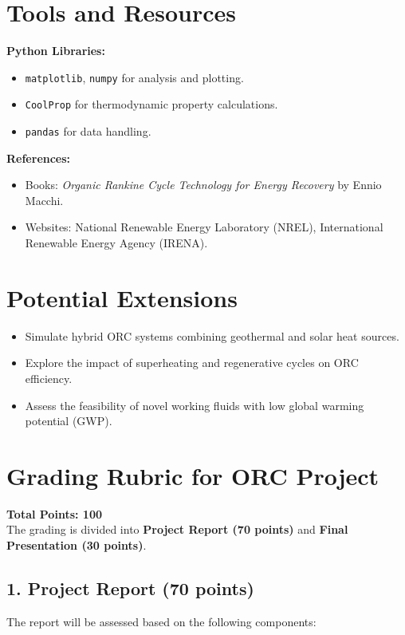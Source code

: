 \documentclass[11pt]{article}
\begin{document}
\section*{Tools and Resources}
\textbf{Python Libraries:}
\begin{itemize}
    \item \texttt{matplotlib}, \texttt{numpy} for analysis and plotting.
    \item \texttt{CoolProp} for thermodynamic property calculations.
    \item \texttt{pandas} for data handling.
\end{itemize}
\textbf{References:}
\begin{itemize}
    \item Books: \textit{Organic Rankine Cycle Technology for Energy Recovery} by Ennio Macchi.
    \item Websites: National Renewable Energy Laboratory (NREL), International Renewable Energy Agency (IRENA).
\end{itemize}

\section*{Potential Extensions}
\begin{itemize}
    \item Simulate hybrid ORC systems combining geothermal and solar heat sources.
    \item Explore the impact of superheating and regenerative cycles on ORC efficiency.
    \item Assess the feasibility of novel working fluids with low global warming potential (GWP).
\end{itemize}

\section*{Grading Rubric for ORC Project}

\textbf{Total Points: 100}\\
The grading is divided into \textbf{Project Report (70 points)} and \textbf{Final Presentation (30 points)}.

\subsection*{1. Project Report (70 points)}
The report will be assessed based on the following components:
\end{document}
